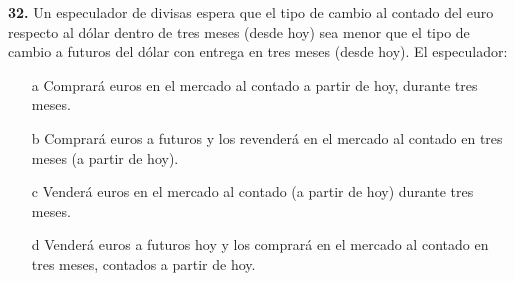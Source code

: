 \documentclass{nuevotema}
\begin{document}
			

\preguntas


\textbf{32.} Un especulador de divisas espera que el tipo de cambio al contado del euro respecto al dólar dentro de tres meses (desde hoy) sea menor que el tipo de cambio a futuros del dólar con entrega en tres meses (desde hoy). El especulador:
\begin{enumerate}
	\item[a] Comprará euros en el mercado al contado a partir de hoy, durante tres meses.
	\item[b] Comprará euros a futuros y los revenderá en el mercado al contado en tres meses (a partir de hoy).
	\item[c] Venderá euros en el mercado al contado (a partir de hoy) durante tres meses.
	\item[d] Venderá euros a futuros hoy y los comprará en el mercado al contado en tres meses, contados a partir de hoy.
\end{enumerate}
\end{document}
